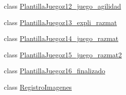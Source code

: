 \begin{DoxyCompactItemize}
\item 
class \mbox{\hyperlink{classdiagnostico_1_1_plantilla_juegoz12__juego__agilidad}{Plantilla\+Juegoz12\+\_\+juego\+\_\+agilidad}}
\item 
class \mbox{\hyperlink{classdiagnostico_1_1_plantilla_juegoz13__expli__razmat}{Plantilla\+Juegoz13\+\_\+expli\+\_\+razmat}}
\item 
class \mbox{\hyperlink{classdiagnostico_1_1_plantilla_juegoz14__juego__razmat}{Plantilla\+Juegoz14\+\_\+juego\+\_\+razmat}}
\item 
class \mbox{\hyperlink{classdiagnostico_1_1_plantilla_juegoz15__juego__razmat2}{Plantilla\+Juegoz15\+\_\+juego\+\_\+razmat2}}
\item 
class \mbox{\hyperlink{classdiagnostico_1_1_plantilla_juegoz16__finalizado}{Plantilla\+Juegoz16\+\_\+finalizado}}
\item 
class \mbox{\hyperlink{classdiagnostico_1_1_registro_imagenes}{Registro\+Imagenes}}
\end{DoxyCompactItemize}
